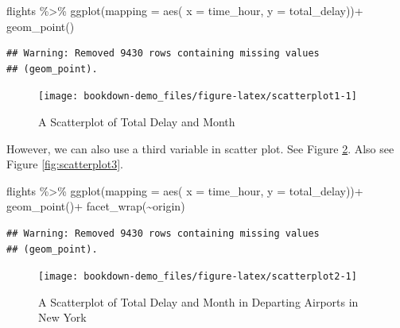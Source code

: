 \documentclass[
]{book}
\newenvironment{Shaded}{\begin{snugshade}}{\end{snugshade}}
\newcommand{\AttributeTok}[1]{\textcolor[rgb]{0.77,0.63,0.00}{#1}}
\newcommand{\FunctionTok}[1]{\textcolor[rgb]{0.00,0.00,0.00}{#1}}
\newcommand{\NormalTok}[1]{#1}
\newcommand{\SpecialCharTok}[1]{\textcolor[rgb]{0.00,0.00,0.00}{#1}}
\begin{document}
\begin{Shaded}
\begin{Highlighting}[]
\NormalTok{flights }\SpecialCharTok{\%\textgreater{}\%} 
  \FunctionTok{ggplot}\NormalTok{(}\AttributeTok{mapping =} \FunctionTok{aes}\NormalTok{( }\AttributeTok{x =}\NormalTok{ time\_hour, }\AttributeTok{y =}\NormalTok{ total\_delay))}\SpecialCharTok{+}
  \FunctionTok{geom\_point}\NormalTok{()}
\end{Highlighting}
\end{Shaded}

\begin{verbatim}
## Warning: Removed 9430 rows containing missing values
## (geom_point).
\end{verbatim}

\begin{figure}

{\centering \texttt{[image: bookdown-demo\_files/figure-latex/scatterplot1-1]} 

}

\caption{A Scatterplot of Total Delay and Month}\label{fig:scatterplot1}
\end{figure}

However, we can also use a third variable in scatter plot. See Figure \ref{fig:scatterplot2}. Also see Figure \ref{fig:scatterplot3}.

\begin{Shaded}
\begin{Highlighting}[]
\NormalTok{flights }\SpecialCharTok{\%\textgreater{}\%} 
  \FunctionTok{ggplot}\NormalTok{(}\AttributeTok{mapping =} \FunctionTok{aes}\NormalTok{( }\AttributeTok{x =}\NormalTok{ time\_hour, }\AttributeTok{y =}\NormalTok{ total\_delay))}\SpecialCharTok{+}
  \FunctionTok{geom\_point}\NormalTok{()}\SpecialCharTok{+}
  \FunctionTok{facet\_wrap}\NormalTok{(}\SpecialCharTok{\textasciitilde{}}\NormalTok{origin)}
\end{Highlighting}
\end{Shaded}

\begin{verbatim}
## Warning: Removed 9430 rows containing missing values
## (geom_point).
\end{verbatim}

\begin{figure}

{\centering \texttt{[image: bookdown-demo\_files/figure-latex/scatterplot2-1]} 

}

\caption{A Scatterplot of Total Delay and Month in Departing Airports in New York}\label{fig:scatterplot2}
\end{figure}
\end{document}
